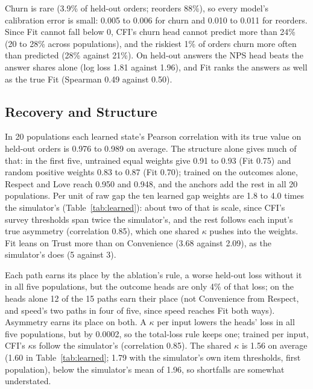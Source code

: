 \documentclass[10pt,twocolumn,letterpaper]{article}
\begin{document}
Churn is rare (3.9\% of held-out orders; reorders 88\%), so every model's calibration error is small: 0.005 to 0.006 for churn and 0.010 to 0.011 for reorders. Since Fit cannot fall below 0, CFI's churn head cannot predict more than 24\% (20 to 28\% across populations), and the riskiest 1\% of orders churn more often than predicted (28\% against 21\%). On held-out answers the NPS head beats the answer shares alone (log loss 1.81 against 1.96), and Fit ranks the answers as well as the true Fit (Spearman 0.49 against 0.50).

\subsection{Recovery and Structure}\label{sec:recovery}

In 20 populations each learned state's Pearson correlation with its true value on held-out orders is 0.976 to 0.989 on average. The structure alone gives much of that: in the first five, untrained equal weights give 0.91 to 0.93 (Fit 0.75) and random positive weights 0.83 to 0.87 (Fit 0.70); trained on the outcomes alone, Respect and Love reach 0.950 and 0.948, and the anchors add the rest in all 20 populations. Per unit of raw gap the ten learned gap weights are 1.8 to 4.0 times the simulator's (Table~\ref{tab:learned}): about two of that is scale, since CFI's survey thresholds span twice the simulator's, and the rest follows each input's true asymmetry (correlation 0.85), which one shared $\kappa$ pushes into the weights. Fit leans on Trust more than on Convenience (3.68 against 2.09), as the simulator's does (5 against 3).

Each path earns its place by the ablation's rule, a worse held-out loss without it in all five populations, but the outcome heads are only 4\% of that loss; on the heads alone 12 of the 15 paths earn their place (not Convenience from Respect, and speed's two paths in four of five, since speed reaches Fit both ways). Asymmetry earns its place on both. A $\kappa$ per input lowers the heads' loss in all five populations, but by 0.0002, so the total-loss rule keeps one; trained per input, CFI's $\kappa$s follow the simulator's (correlation 0.85). The shared $\kappa$ is 1.56 on average (1.60 in Table~\ref{tab:learned}; 1.79 with the simulator's own item thresholds, first population), below the simulator's mean of 1.96, so shortfalls are somewhat understated.
\end{document}
